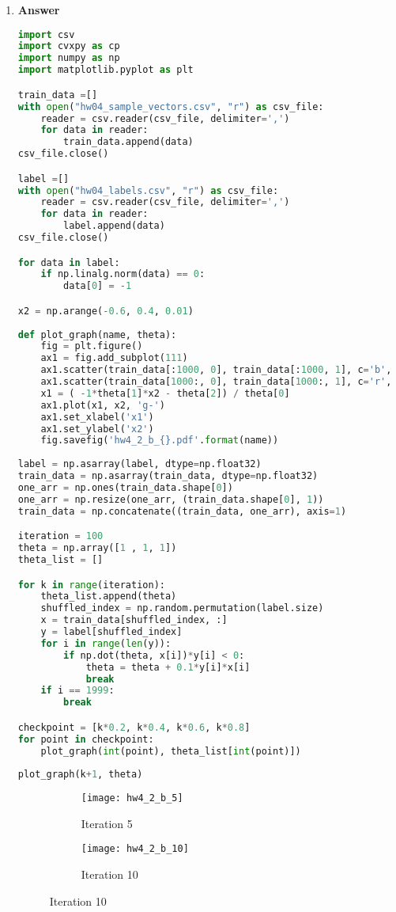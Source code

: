 \documentclass[11pt]{article}
\begin{document}
\begin{enumerate}[label=(\alph*)]
\begin{enumerate}[label=(\roman*)]
\item  \textbf{Answer}

\begin{lstlisting}[language=Python, showstringspaces=false]
import csv
import cvxpy as cp
import numpy as np
import matplotlib.pyplot as plt

train_data =[]
with open("hw04_sample_vectors.csv", "r") as csv_file:
    reader = csv.reader(csv_file, delimiter=',')    
    for data in reader:
        train_data.append(data)        
csv_file.close()

label =[]
with open("hw04_labels.csv", "r") as csv_file:    
    reader = csv.reader(csv_file, delimiter=',')    
    for data in reader:
        label.append(data)        
csv_file.close()

for data in label:
    if np.linalg.norm(data) == 0:
        data[0] = -1

x2 = np.arange(-0.6, 0.4, 0.01)
        
def plot_graph(name, theta):
    fig = plt.figure()
    ax1 = fig.add_subplot(111)
    ax1.scatter(train_data[:1000, 0], train_data[:1000, 1], c='b', s=3)
    ax1.scatter(train_data[1000:, 0], train_data[1000:, 1], c='r', s=3)
    x1 = ( -1*theta[1]*x2 - theta[2]) / theta[0]
    ax1.plot(x1, x2, 'g-')
    ax1.set_xlabel('x1')
    ax1.set_ylabel('x2')
    fig.savefig('hw4_2_b_{}.pdf'.format(name))
        
label = np.asarray(label, dtype=np.float32)
train_data = np.asarray(train_data, dtype=np.float32)
one_arr = np.ones(train_data.shape[0])
one_arr = np.resize(one_arr, (train_data.shape[0], 1))
train_data = np.concatenate((train_data, one_arr), axis=1)

iteration = 100
theta = np.array([1 , 1, 1])
theta_list = []

for k in range(iteration):
    theta_list.append(theta)
    shuffled_index = np.random.permutation(label.size) 
    x = train_data[shuffled_index, :] 
    y = label[shuffled_index] 
    for i in range(len(y)):
        if np.dot(theta, x[i])*y[i] < 0:
            theta = theta + 0.1*y[i]*x[i]
            break
    if i == 1999:
        break

checkpoint = [k*0.2, k*0.4, k*0.6, k*0.8]
for point in checkpoint:
    plot_graph(int(point), theta_list[int(point)])
        
plot_graph(k+1, theta)
\end{lstlisting}

\begin{figure}[H]
\begin{subfigure}{.5\textwidth}
  \centering
  \texttt{[image: hw4\_2\_b\_5]}
  \caption{Iteration 5}
  \label{fig:hw4_2_b_5}
\end{subfigure}
\begin{subfigure}{.5\textwidth}
  \centering
  \texttt{[image: hw4\_2\_b\_10]}
  \caption{Iteration 10}
  \label{fig:hw4_2_b_10}
\end{subfigure}


\end{figure}
\end{enumerate}
\end{enumerate}
\end{document}
